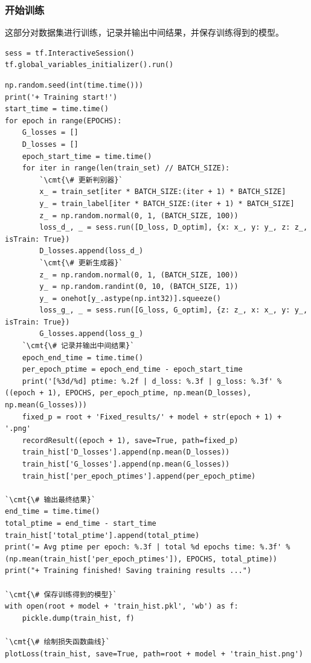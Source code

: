 \documentclass[a4paper, 12pt]{article}
\begin{document}
\subsubsection{开始训练}

这部分对数据集进行训练，记录并输出中间结果，并保存训练得到的模型。

\begin{lstlisting}[style=myPython,caption={启动 TensorFlow 会话，初始化所有变量}]
sess = tf.InteractiveSession()
tf.global_variables_initializer().run()
\end{lstlisting}

\begin{lstlisting}[style=myPython,caption={对数据集进行训练，并输出中间结果}]
np.random.seed(int(time.time()))
print('+ Training start!')
start_time = time.time()
for epoch in range(EPOCHS):
    G_losses = []
    D_losses = []
    epoch_start_time = time.time()
    for iter in range(len(train_set) // BATCH_SIZE):
        `\cmt{\# 更新判别器}`
        x_ = train_set[iter * BATCH_SIZE:(iter + 1) * BATCH_SIZE]
        y_ = train_label[iter * BATCH_SIZE:(iter + 1) * BATCH_SIZE]
        z_ = np.random.normal(0, 1, (BATCH_SIZE, 100))
        loss_d_, _ = sess.run([D_loss, D_optim], {x: x_, y: y_, z: z_, isTrain: True})
        D_losses.append(loss_d_)
        `\cmt{\# 更新生成器}`
        z_ = np.random.normal(0, 1, (BATCH_SIZE, 100))
        y_ = np.random.randint(0, 10, (BATCH_SIZE, 1))
        y_ = onehot[y_.astype(np.int32)].squeeze()
        loss_g_, _ = sess.run([G_loss, G_optim], {z: z_, x: x_, y: y_, isTrain: True})
        G_losses.append(loss_g_)
    `\cmt{\# 记录并输出中间结果}`
    epoch_end_time = time.time()
    per_epoch_ptime = epoch_end_time - epoch_start_time
    print('[%3d/%d] ptime: %.2f | d_loss: %.3f | g_loss: %.3f' % ((epoch + 1), EPOCHS, per_epoch_ptime, np.mean(D_losses), np.mean(G_losses)))
    fixed_p = root + 'Fixed_results/' + model + str(epoch + 1) + '.png'
    recordResult((epoch + 1), save=True, path=fixed_p)
    train_hist['D_losses'].append(np.mean(D_losses))
    train_hist['G_losses'].append(np.mean(G_losses))
    train_hist['per_epoch_ptimes'].append(per_epoch_ptime)

`\cmt{\# 输出最终结果}`
end_time = time.time()
total_ptime = end_time - start_time
train_hist['total_ptime'].append(total_ptime)
print('= Avg ptime per epoch: %.3f | total %d epochs time: %.3f' % (np.mean(train_hist['per_epoch_ptimes']), EPOCHS, total_ptime))
print("+ Training finished! Saving training results ...")

`\cmt{\# 保存训练得到的模型}`
with open(root + model + 'train_hist.pkl', 'wb') as f:
    pickle.dump(train_hist, f)

`\cmt{\# 绘制损失函数曲线}`
plotLoss(train_hist, save=True, path=root + model + 'train_hist.png')
\end{lstlisting}
\end{document}
